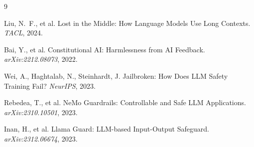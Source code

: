 \documentclass[11pt,twocolumn]{article}
\begin{document}

\begin{thebibliography}{9}

Liu, N.~F., et al.
\newblock Lost in the Middle: How Language Models Use Long Contexts.
\newblock \emph{TACL}, 2024.

Bai, Y., et al.
\newblock Constitutional AI: Harmlessness from AI Feedback.
\newblock \emph{arXiv:2212.08073}, 2022.

Wei, A., Haghtalab, N., Steinhardt, J.
\newblock Jailbroken: How Does LLM Safety Training Fail?
\newblock \emph{NeurIPS}, 2023.

Rebedea, T., et al.
\newblock NeMo Guardrails: Controllable and Safe LLM Applications.
\newblock \emph{arXiv:2310.10501}, 2023.

Inan, H., et al.
\newblock Llama Guard: LLM-based Input-Output Safeguard.
\newblock \emph{arXiv:2312.06674}, 2023.

\end{thebibliography}
\end{document}
